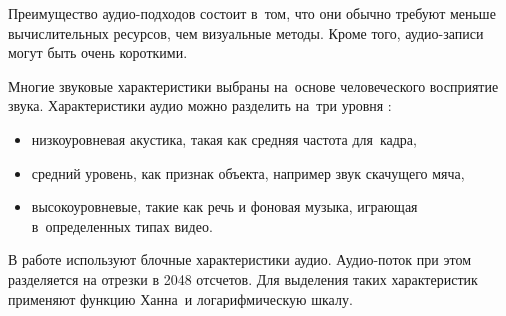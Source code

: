 Преимущество аудио-подходов состоит в~том,
что они обычно требуют меньше вычислительных ресурсов, чем визуальные методы.
Кроме того, аудио-записи могут быть очень короткими.

Многие звуковые характеристики выбраны на~основе человеческого восприятие звука.
Характеристики аудио можно разделить на~три уровня \cite{Chen:2008}:
\begin{itemize}
    \item низкоуровневая акустика, такая как средняя частота для~кадра,
    \item средний уровень, как признак объекта, например звук скачущего мяча,
    \item высокоуровневые, такие как речь и фоновая музыка,
        играющая в~определенных типах видео.
\end{itemize}


В работе \cite{Seyerlehner:2010} используют блочные характеристики аудио.
Аудио-поток при этом разделяется на отрезки в 2048 отсчетов.
Для выделения таких характеристик применяют функцию Ханна\
и логарифмическую шкалу.



